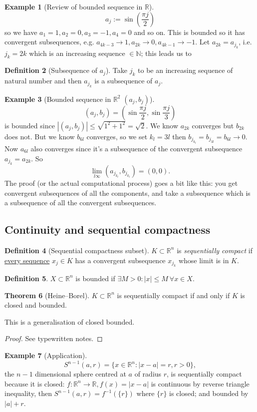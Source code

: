 \documentclass[a4paper]{article}
\theoremstyle{definition}
\newtheorem{defn}{Definition}[subsection]
\newtheorem{thm}[defn]{Theorem}
\newtheorem{eg}[defn]{Example}
\begin{document}
\begin{eg}[Review of bounded sequence in $\mathbb R$]
\[
a_j := \sin \left( \frac{\pi j}{2} \right)
\]
so we have $a_1=1,a_2=0,a_3=-1,a_4=0$ and so on. This is bounded so it has convergent subsequences, e.g. $a_{4k-3}\rightarrow 1,a_{2k}\rightarrow 0, a_{4k-1}\rightarrow -1$. Let $a_{2k}=a_{j_k}$, i.e. $j_k=2k$ which is an increasing sequence $\in \mathbb N$; this leads us to
\end{eg}
\begin{defn}[Subsequence of $a_j$]
Take $j_k$ to be an increasing sequence of natural number and then $a_{j_k}$ is a subsequence of $a_j$.
\end{defn}
\begin{eg}[Bounded sequence in $\mathbb R^2$ $(a_j,b_j)$]
\[
(a_j,b_j)=\left(\sin \frac{\pi j}{2},\sin \frac{\pi j}{3}\right)
\]
is bounded since $|(a_j,b_j)|\leq \sqrt{1^2+1^2}=\sqrt{2}$. We know $a_{2k}$ converges but $b_{2k}$ does not. But we know $b_{6l}$ converges, so we set $k_l=3l$ then $b_{j_{k_l}}=b_{j_{3l}}=b_{6l} \rightarrow 0$. Now $a_{6l}$ also converges since it's a subsequence of the convergent subsequence $a_{j_k}=a_{2k}$. So
\[
\lim_{l\infty}\left(a_{j_{k_l}},b_{j_{k_l}} \right)=(0,0).
\]
The proof (or the actual computational process) goes a bit like this: you get convergent subsequences of all the components, and take a subsequence which is a subsequence of all the convergent subsequences.
\end{eg}

\subsection{Continuity and sequential compactness}
\begin{defn}[Sequential compactness subset]
$K\subset \mathbb R^n$ is \textit{sequentially compact} if \underline{every sequence} $x_j\in K$ has a convergent subsequence $x_{j_k}$ whose limit is in $K$.
\end{defn}
\begin{defn}
$X\subset \mathbb R^n$ is bounded if $\exists M>0 : |x|\leq M \ \forall x\in X$.
\end{defn}
\begin{thm}[Heine–Borel]
$K\subset \mathbb R^n$ is sequentially compact if and only if $K$ is closed and bounded.
\end{thm}
This is a generalisation of closed bounded.
\begin{proof}
See typewritten notes.
\end{proof}
\begin{eg}[Application]
\[
S^{n-1}(a,r)=\{x\in \mathbb R^n : |x-a|=r, r>0\},
\]
the $n-1$ dimensional sphere centred at $a$ of radius $r$, is sequentially compact because it is closed: $f:\mathbb R^n \rightarrow \mathbb R, f(x)=|x-a|$ is continuous by reverse triangle inequality, then $S^{n-1}(a,r)=f^{-1}(\{r\})$ where $\{r\}$ is closed; and bounded by $|a|+r$.
\end{eg}
\end{document}
